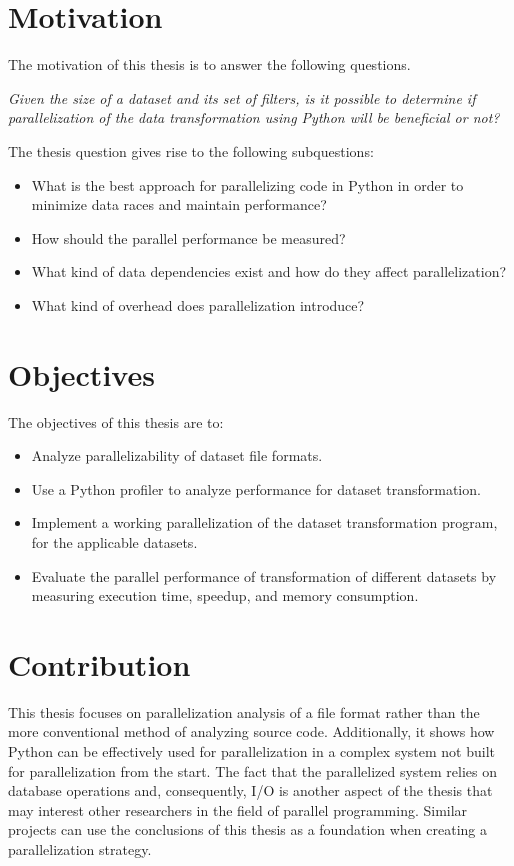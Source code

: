 \section{Motivation}
The motivation of this thesis is to answer the following questions.

\emph{Given the size of a dataset and its set of filters, is it possible to determine 
if parallelization of the data transformation using Python will be beneficial or not?}

The thesis question gives rise to the following subquestions:
\begin{itemize}
    \item What is the best approach for parallelizing code in Python in order to minimize data races and maintain performance?
    \item How should the parallel performance be measured?
    \item What kind of data dependencies exist and how do they affect parallelization?
    \item What kind of overhead does parallelization introduce?
\end{itemize}

\section{Objectives}
The objectives of this thesis are to:
\begin{itemize}
    \item Analyze parallelizability of dataset file formats.
    \item Use a Python profiler to analyze  performance for dataset transformation.
    \item Implement a working parallelization of the dataset transformation program, for the applicable datasets.
    \item Evaluate the parallel performance of transformation of different datasets by measuring execution time, speedup, and memory consumption.
\end{itemize}

\section{Contribution}
This thesis focuses on parallelization analysis of a file format rather than the more conventional method of analyzing source code. Additionally,
it shows how Python can be effectively used for parallelization in a complex system not built for parallelization from the start. The fact that
the parallelized system relies on database operations and, consequently, I/O is another aspect of the thesis that may interest other researchers
in the field of parallel programming. Similar projects can use the conclusions of this thesis as a foundation when creating a parallelization strategy.
